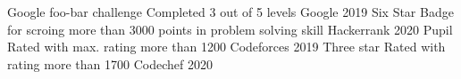 
\begin{cvhonors}
 
    \cvhonor
   {Google foo-bar challenge}
    {Completed 3 out of 5 levels}
    {Google}
    {2019}
   \cvhonor
    {Six Star Badge}
    {for scroing more than 3000 points in problem solving skill}
    {Hackerrank}
    {2020}
     \cvhonor
    {Pupil Rated}
    {with max. rating more than 1200}
    {Codeforces}
    {2019}
    \cvhonor
    {Three star Rated}
    {with rating more than 1700}
    {Codechef}
    {2020}
\end{cvhonors}


